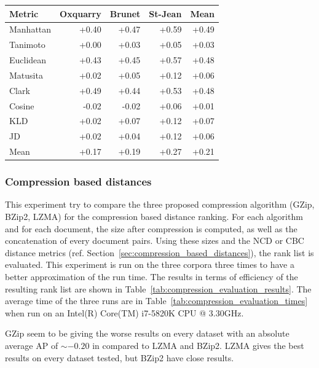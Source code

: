 \begin{table}
  \vspace{0.5cm}

  \label{tab:gain_750_mfw}
  \begin{tabular}{l r r r|r}
    \toprule
    Metric & Oxquarry & Brunet & St-Jean & Mean \\
    \midrule
    Manhattan & +0.40 & +0.47 & +0.59 & +0.49 \\
    Tanimoto  & +0.00 & +0.03 & +0.05 & +0.03 \\
    Euclidean & +0.43 & +0.45 & +0.57 & +0.48 \\
    Matusita  & +0.02 & +0.05 & +0.12 & +0.06 \\
    Clark     & +0.49 & +0.44 & +0.53 & +0.48 \\
    Cosine    & -0.02 & -0.02 & +0.06 & +0.01 \\
    KLD       & +0.02 & +0.07 & +0.12 & +0.07 \\
    JD        & +0.02 & +0.04 & +0.12 & +0.06 \\
    \midrule
    Mean      & +0.17 & +0.19 & +0.27 & +0.21 \\
    \bottomrule
  \end{tabular}
\end{table}

\subsubsection{Compression based distances}

This experiment try to compare the three proposed compression algorithm (GZip, BZip2, LZMA) for the compression based distance ranking.
For each algorithm and for each document, the size after compression is computed, as well as the concatenation of every document pairs.
Using these sizes and the NCD or CBC distance metrics (ref. Section~\ref{sec:compression_based_distances}), the rank list is evaluated.
This experiment is run on the three corpora three times to have a better approximation of the run time.
The results in terms of efficiency of the resulting rank list are shown in Table~\ref{tab:compression_evaluation_results}.
The average time of the three runs are in Table~\ref{tab:compression_evaluation_times} when run on an Intel(R) Core(TM) i7-5820K CPU @ 3.30GHz.

GZip seem to be giving the worse results on every dataset with an absolute average AP of $\sim -0.20$ in compared to LZMA and BZip2.
LZMA gives the best results on every dataset tested, but BZip2 have close results.

